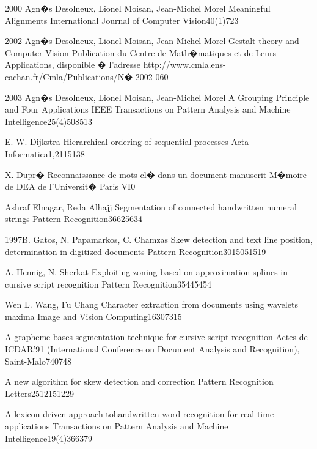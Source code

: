  {2000} {Agn�s Desolneux, Lionel Moisan, Jean-Michel Morel}
{Meaningful Alignments}
{International Journal of Computer Vision}{40(1)}{7}{23}

 {2002} {Agn�s Desolneux, Lionel Moisan, Jean-Michel Morel}
{Gestalt theory and Computer Vision}
{Publication du Centre de Math�matiques et de Leurs Applications, disponible � l'adresse http://www.cmla.ens-cachan.fr/Cmla/Publications/}{N� 2002-06}{0}{}

 {2003} {Agn�s Desolneux, Lionel Moisan, Jean-Michel Morel}
{A Grouping Principle and Four Applications}
{IEEE Transactions on Pattern Analysis and Machine Intelligence}{25(4)}{508}{513}

 {E. W. Dijkstra}
{Hierarchical ordering of sequential processes}
{Acta Informatica}{1,2}{115}{138}

 {X.  Dupr�}
{Reconnaissance de mots-cl� dans un document manuscrit}
{M�moire de DEA de l'Universit� Paris VI}{}{0}{}

 {Ashraf Elnagar, Reda Alhajj}
{Segmentation of connected handwritten numeral strings}
{Pattern Recognition}{36}{625}{634}

 {1997}{B. Gatos, N. Papamarkos, C. Chamzas}
{Skew detection and text line position, determination in digitized documents}
{Pattern Recognition}{30}{1505}{1519}

 {A.  Hennig, N. Sherkat}
{Exploiting zoning based on approximation splines in cursive script recognition}
{Pattern Recognition}{35}{445}{454}

 {Wen L. Wang, Fu Chang}
{Character extraction from documents using wavelets maxima}
{Image and Vision Computing}{16}{307}{315}

{A grapheme-bases segmentation technique for cursive script recognition}
{Actes de ICDAR'91 (International Conference on Document Analysis and Recognition), Saint-Malo}{740}{748} 

{A new algorithm for skew detection and correction}
{Pattern Recognition Letters}{25}{1215}{1229}

{A lexicon driven approach tohandwritten word recognition for real-time applications}
{Transactions on Pattern Analysis and Machine Intelligence}{19(4)}{366}{379}

